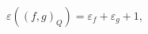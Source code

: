 \begin{equation}
\varepsilon\left(  (f,g)_{Q}\right)  =\varepsilon_{f}+\varepsilon
_{g}+1,\label{1.3}%
\end{equation}

